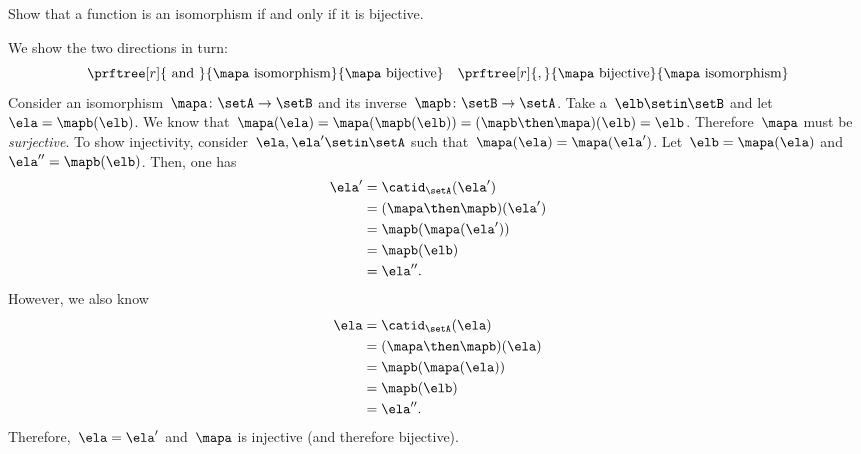 \begin{exercise}
    \label{ex:bijective-functions-are-isomorphisms}
    Show that a function is an isomorphism if and only if it is bijective.
\end{exercise}
\begin{solution}
    We show the two directions in turn:
    \begin{equation*}
        \prftree[r]{\text{ and }}{\mapa \text{ isomorphism}}{\mapa \text{ bijective}} \quad \prftree[r]{,}{\mapa \text{ bijective}}{\mapa \text{ isomorphism}}
    \end{equation*}
    Consider an isomorphism~$\mapa\colon \setA \to \setB$ and its inverse~$\mapb\colon \setB\to \setA$.
    Take a~$\elb\setin\setB$ and let~$\ela= \mapb(\elb)$.
    We know that~$\mapa(\ela)=\mapa(\mapb(\elb))=(\mapb\then \mapa)(\elb)=\elb$.
    Therefore~$\mapa$ must be \emph{surjective}.
    To show injectivity, consider~$\ela,\ela'\setin\setA$ such that~$\mapa(\ela)=\mapa(\ela')$.
    Let~$\elb=\mapa(\ela)$ and~$\ela''=\mapb(\elb)$.
    Then, one has
    \begin{equation*}
        \begin{aligned}
            \ela' & =\catid_\setA(\ela') \\
                  & =(\mapa \then \mapb)(\ela') \\
                  & =\mapb(\mapa(\ela')) \\
                  & =\mapb(\elb) \\
                  & =\ela''.
        \end{aligned}
    \end{equation*}
    However, we also know
    \begin{equation*}
        \begin{aligned}
            \ela & =\catid_\setA(\ela) \\
                 & =(\mapa \then \mapb)(\ela) \\
                 & =\mapb(\mapa(\ela)) \\
                 & =\mapb(\elb) \\
                 & =\ela''.
        \end{aligned}
    \end{equation*}
    Therefore,~$\ela=\ela'$ and~$\mapa$ is injective (and therefore bijective).


\end{solution}

